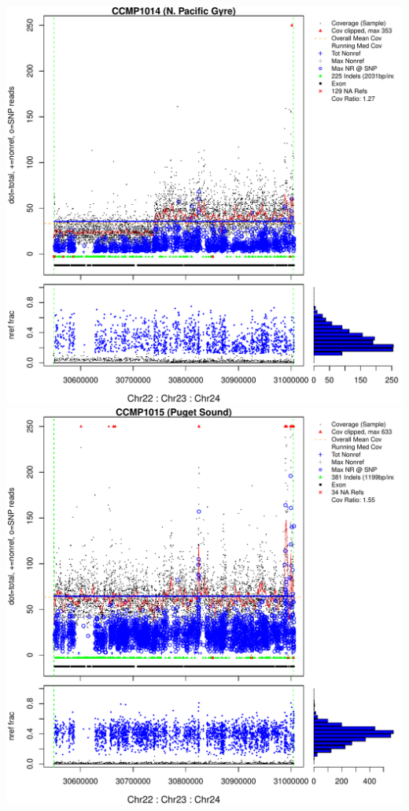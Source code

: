 \documentclass{article}\usepackage[]{graphicx}\usepackage[]{color}
\makeatletter
\def\maxwidth{ %
  \ifdim\Gin@nat@width>\linewidth
    \linewidth
  \else
    \Gin@nat@width
  \fi
}
\newenvironment{knitrout}{}{} %
\makeatother
\begin{document}
\begin{knitrout}
{\includegraphics[width=\maxwidth]{figs-knitr/unnamed-chunk-42-5} 
\includegraphics[width=\maxwidth]{figs-knitr/unnamed-chunk-42-6} 
}
\end{knitrout}
\end{document}
